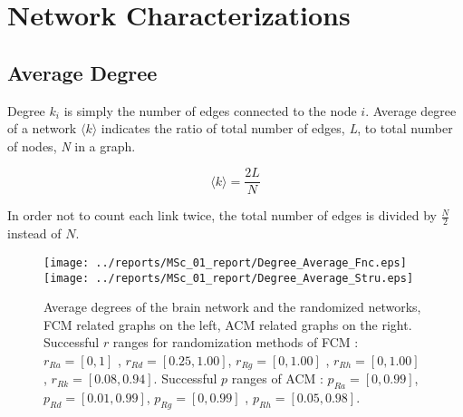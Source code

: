 
\chapter{Network Characterizations} %

\label{AppendixB} %


\section{Average Degree}

Degree $k_i$ is simply the number of edges connected to the node $i$. Average degree of a network $\langle k \rangle$ indicates the ratio of total number of edges, \textit{L}, to total number of nodes, \textit{N} in a graph.
 
\begin{equation}
\langle k \rangle = \frac{2L}{N}
\end{equation} 
 
In order not to count each link twice, the total number of edges is divided by $\frac{N}{2}$ instead of $N$. 
 

%
%
% 
%
%
%
%
% 
%



\begin{figure}[htbp]
 
  \centering
	 \texttt{[image: ../reports/MSc\_01\_report/Degree\_Average\_Fnc.eps]}
	 \texttt{[image: ../reports/MSc\_01\_report/Degree\_Average\_Stru.eps]}
  \caption[Average Degree]{Average degrees of the brain network and the randomized networks, FCM related graphs on the left, ACM related graphs on the right. Successful $r$ ranges for randomization methods of FCM :  $r_{Ra}=[0,1]$ , $r_{Rd} = [0.25,1.00]$, $r_{Rg} = [0,1.00]$ , $r_{Rh} = [0,1.00]$ , $r_{Rk} = [0.08,0.94]$. Successful $p$ ranges of ACM : $p_{Ra}=[0,0.99]$, $p_{Rd}=[0.01 , 0.99]$, $p_{Rg}=[0, 0.99]$ , $p_{Rh}=[0.05 , 0.98]$.} 
    \label{fig:Average Degree}
 	
\end{figure}  


